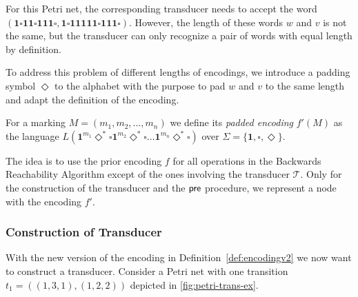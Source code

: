 For this Petri net, the corresponding transducer needs to accept the word \break ${(\bm{1 \square 11 \square 111 \square},\bm{1 \square 11111 \square 111 \square})}$. However, the length of these words $w$ and $v$ is not the same, but the transducer can only recognize a pair of words with equal length by definition. 

To address this problem of different lengths of encodings, we introduce a padding symbol $\Diamond$ to the alphabet with the purpose to pad $w$ and $v$ to the same length and adapt the definition of the encoding.

\begin{definition}\label{def:encodingv2}
For a marking $M = (m_{1},m_{2},\dots,m_{n})$ we define its \emph{padded encoding} $f'(M)$ as the language $L(\bm{1}^{m_{1}} \Diamond^{\bm{*}} \square \bm{1}^{m_{2}} \Diamond^{\bm{*}}  \square \ldots \bm{1}^{m_{n}} \Diamond^{\bm{*}}  \square)$ over $\Sigma = \{\bm{1}, \square, \Diamond \}$.
\end{definition}

The idea is to use the prior encoding $f$ for all operations in the Backwards Reachability Algorithm except of the ones involving the transducer $\mathcal{T}$. Only for the construction of the transducer and the $\operatorname{\textsf{pre}}$ procedure, we represent a node with the encoding $f'$. 



\subsubsection{Construction of Transducer}

With the new version of the encoding in Definition~\autoref{def:encodingv2} we now want to construct a transducer. Consider a Petri net with one transition $t_{1} = ((1,3,1),(1,2,2))$ depicted in \autoref{fig:petri-trans-ex}.




